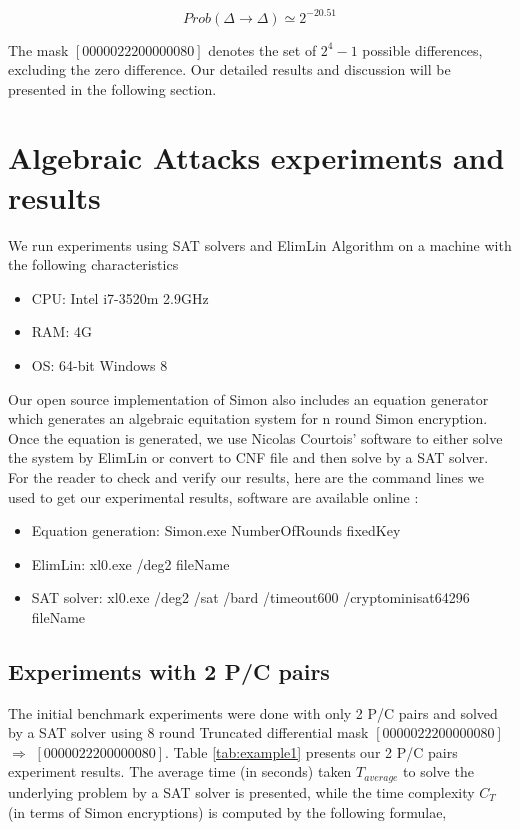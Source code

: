 \begin{equation}
Prob(\Delta\rightarrow \Delta)\simeq2^{-20.51}
\end{equation}

The mask $[00000222 00000080]$ denotes the set of $2^4-1$ possible differences,
excluding the zero difference.
Our detailed results and discussion will be presented in the following section.

\section{Algebraic Attacks experiments and results} \label{Sec:SimonResult}
We run experiments using SAT solvers and ElimLin Algorithm on a machine with the
following characteristics
\begin{small}
\begin{itemize}
	\item CPU: Intel i7-3520m 2.9GHz
	\item RAM: 4G
	\item OS: 64-bit Windows 8
\end{itemize}
\end{small}
Our open source implementation of Simon also includes an equation generator which generates an algebraic equitation system for n round Simon encryption. Once the equation is generated, we use Nicolas Courtois' software \cite{EquationSolving} to either solve the system by ElimLin or convert to CNF file and then solve by a SAT solver. For the reader to check and verify our results, here are the command lines we used to get our experimental results, software are available online \cite{simonref,EquationSolving} :
\begin{small}
\begin{itemize}
	\item Equation generation: Simon.exe NumberOfRounds fixedKey  
	\item ElimLin: xl0.exe /deg2 fileName 
	\item SAT solver: xl0.exe /deg2 /sat /bard /timeout600 /cryptominisat64296 fileName
\end{itemize}
\end{small}
\subsection{Experiments with 2 P/C pairs}
The initial benchmark experiments were done with only 2 P/C pairs and solved by a SAT solver using 8 round Truncated differential mask $[00000222 00000080]$ $\Rightarrow$ $[00000222 00000080]$. Table \ref{tab:example1} presents our 2 P/C pairs experiment results. The average time (in seconds) taken $T_{average}$
to solve the underlying problem
by a SAT solver is presented, while the time complexity $C_T$
(in terms of Simon encryptions) is
computed by the following formulae,

